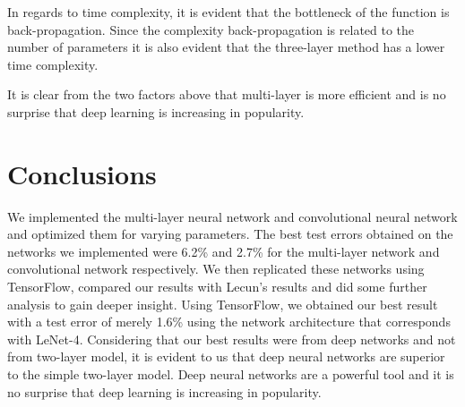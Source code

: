 \documentclass[12pt, twocolumn]{article}
\begin{document}
In regards to time complexity, it is evident that the bottleneck of the function is back-propagation. Since the complexity back-propagation is related to the number of parameters it is also evident that the three-layer method has a lower time complexity.

It is clear from the two factors above that multi-layer is more efficient and is no surprise that deep learning is increasing in popularity.


\section{Conclusions}
We implemented the multi-layer neural network and convolutional neural network and optimized them for varying parameters. The best test errors obtained on the networks we implemented were 6.2\% and 2.7\% for the multi-layer network and convolutional network respectively. We then replicated these networks using TensorFlow, compared our results with Lecun's results and did some further analysis to gain deeper insight.
 Using TensorFlow, we obtained our best result with a test error of merely 1.6\% using the network architecture that corresponds with LeNet-4. Considering that our best results were from deep networks and not from two-layer model, it is evident to us that deep neural networks are superior to the simple two-layer model. Deep neural networks are a powerful tool and it is no surprise that deep learning is increasing in popularity.



\end{document}
